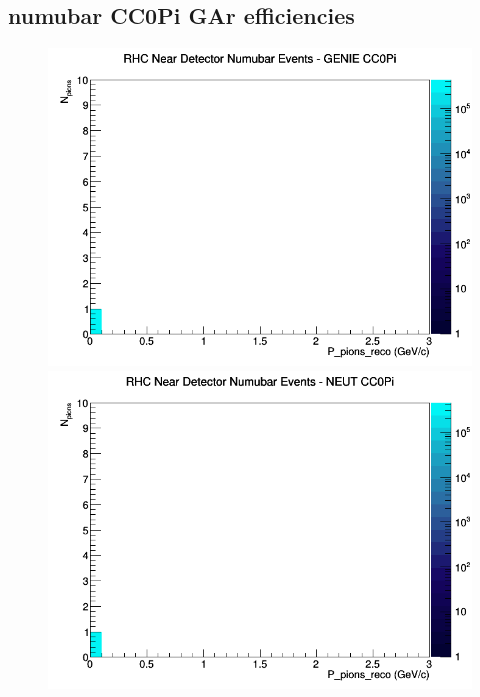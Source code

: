 \documentclass[12pt]{article}
\begin{document}
\subsection{numubar CC0Pi GAr efficiencies}
\begin{figure}[h]
\includegraphics[width=\linewidth]{eff_N_P/GAr/pions/CC0Pi_RHC_ND_numubar_N_P_GENIE.png}
\endminipage
{}
\includegraphics[width=\linewidth]{eff_N_P/GAr/pions/CC0Pi_RHC_ND_numubar_N_P_NEUT.png}
\endminipage
{}

\end{figure}
\end{document}
